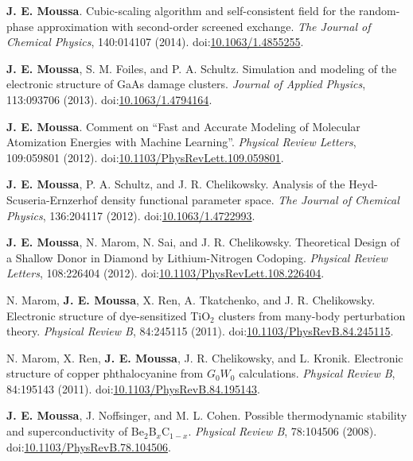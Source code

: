 \documentclass[10pt]{article}
\makeatletter
\newlength{\bibhang}
\newlength{\bibsep}
 {\@listi \global\bibsep\itemsep \global\advance\bibsep by\parsep}
\newenvironment{bibsection}%
        {\vspace{-1.6\baselineskip}\begin{etaremune}[leftmargin=1.6em]{%
       \setlength{\leftmargin}{\bibhang}%
       \setlength{\itemindent}{-\leftmargin}%
       \setlength{\itemsep}{\bibsep}%
       \setlength{\parsep}{\z@}%
        \setlength{\partopsep}{0pt}%
        \setlength{\topsep}{0pt}}}
        {\end{etaremune}\vspace{-.6\baselineskip}}
\newcommand\doilink[1]{\href{http://dx.doi.org/#1}{#1}}
\newcommand\doi[1]{doi:\doilink{#1}}
\makeatother
\begin{document}
\begin{bibsection}
    \item \textbf{J. E. Moussa}. Cubic-scaling algorithm and self-consistent field for the random-phase approximation with second-order screened exchange.
     \emph{The Journal of Chemical Physics}, 140:014107 (2014). \doi{10.1063/1.4855255}.

    \item \textbf{J. E. Moussa}, S. M. Foiles, and P. A. Schultz.
         Simulation and modeling of the electronic structure of GaAs damage clusters.
         \emph{Journal of Applied Physics}, 113:093706 (2013). \doi{10.1063/1.4794164}.

    \item \textbf{J. E. Moussa}.
         Comment on ``Fast and Accurate Modeling of Molecular Atomization Energies with Machine Learning''.
         \emph{Physical Review Letters}, 109:059801 (2012). \doi{10.1103/PhysRevLett.109.059801}.

    \item \textbf{J. E. Moussa}, P. A. Schultz, and J. R. Chelikowsky.
         Analysis of the Heyd-Scuseria-Ernzerhof density functional parameter space.
         \emph{The Journal of Chemical Physics}, 136:204117 (2012). \doi{10.1063/1.4722993}.

    \item \textbf{J. E. Moussa}, N. Marom, N. Sai, and J. R. Chelikowsky.
         Theoretical Design of a Shallow Donor in Diamond by Lithium-Nitrogen Codoping.
         \emph{Physical Review Letters}, 108:226404 (2012). \doi{10.1103/PhysRevLett.108.226404}.

    \item N. Marom, \textbf{J. E. Moussa}, X. Ren, A. Tkatchenko, and J. R. Chelikowsky.
         Electronic structure of dye-sensitized TiO$_2$ clusters from many-body perturbation theory.
         \emph{Physical Review B}, 84:245115 (2011). \doi{10.1103/PhysRevB.84.245115}.

    \item N. Marom, X. Ren, \textbf{J. E. Moussa}, J. R. Chelikowsky, and L. Kronik.
         Electronic structure of copper phthalocyanine from $G_0 W_0$ calculations.
         \emph{Physical Review B}, 84:195143 (2011). \doi{10.1103/PhysRevB.84.195143}.

    \item \textbf{J. E. Moussa}, J. Noffsinger, and M. L. Cohen.
         Possible thermodynamic stability and superconductivity of Be$_2$B$_x$C$_{1-x}$.
         \emph{Physical Review B}, 78:104506 (2008). \doi{10.1103/PhysRevB.78.104506}.


\end{bibsection}
\end{document}
